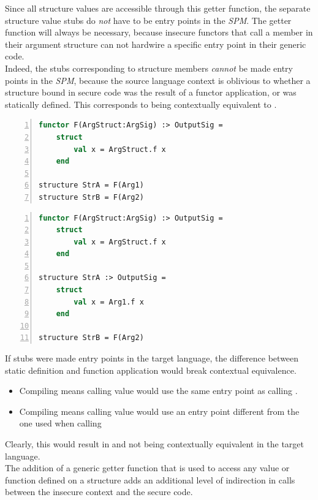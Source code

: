 Since all structure values are accessible through this getter function, the separate structure value stubs do \emph{not} have to be entry points in the \emph{SPM}. The getter function will always be necessary, because insecure functors that call a member in their argument structure can not hardwire a specific entry point in their generic code.
\\[1em]
\label{sec:StaticDefinitionFunctorApplication}
Indeed, the stubs corresponding to structure members \emph{cannot} be made entry points in the \emph{SPM}, because the source language context is oblivious to whether a structure bound in secure code was the result of a functor application, or was statically defined. This corresponds to  being contextually equivalent to .

\begin{lstlisting}[frame=single,numbers=left, language=ML, caption={[Functor Application or Static Definition: 1]Binding StrA and StrB using functor application.},
label=lst:FunctorApplicationOrStaticDefinition1, morekeywords={where}]
functor F(ArgStruct:ArgSig) :> OutputSig =
    struct
        val x = ArgStruct.f x
    end
    
structure StrA = F(Arg1)
structure StrB = F(Arg2)
\end{lstlisting}

\begin{lstlisting}[frame=single,numbers=left, language=ML, caption={[Functor Application or Static Definition: 2]Binding StrA and StrB using both static definition and functor application.},
label=lst:FunctorApplicationOrStaticDefinition2, morekeywords={where}]
functor F(ArgStruct:ArgSig) :> OutputSig =
    struct
        val x = ArgStruct.f x
    end
    
structure StrA :> OutputSig =
    struct
        val x = Arg1.f x
    end

structure StrB = F(Arg2)
\end{lstlisting}


If stubs were made entry points in the target language, the difference between static definition and function application would break contextual equivalence.
\begin{itemize}
\item Compiling  means calling value  would use the same entry point as calling .
\item Compiling  means calling value  would use an entry point different from the one used when calling 
\end{itemize}
Clearly, this would result in  and  not being contextually equivalent in the target language.
\\[1em]
The addition of a generic getter function that is used to access any value or function defined on a structure adds an additional level of indirection in calls between the insecure context and the secure code.

